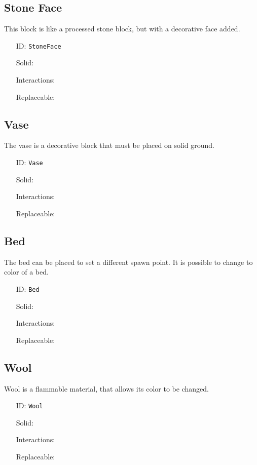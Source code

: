 \subsection{Stone Face}\label{subsec:blocks_stone face}
This block is like a processed stone block, but with a decorative face added.
\newline
\begin{itemize}[nosep]
    \item[ID:] \texttt{StoneFace}
    \item[Solid:]  \Checkmark \item[Interactions:]  \XSolidBrush \item[Replaceable:]  \XSolidBrush
\end{itemize}

\subsection{Vase}\label{subsec:blocks_vase}
The vase is a decorative block that must be placed on solid ground.
\newline
\begin{itemize}[nosep]
    \item[ID:] \texttt{Vase}
    \item[Solid:]  \Checkmark \item[Interactions:]  \XSolidBrush \item[Replaceable:]  \XSolidBrush
\end{itemize}

\subsection{Bed}\label{subsec:blocks_bed}
The bed can be placed to set a different spawn point.
It is possible to change to color of a bed.
\newline
\begin{itemize}[nosep]
    \item[ID:] \texttt{Bed}
    \item[Solid:]  \Checkmark \item[Interactions:]  \Checkmark \item[Replaceable:]  \XSolidBrush
\end{itemize}

\subsection{Wool}\label{subsec:blocks_wool}
Wool is a flammable material, that allows its color to be changed.
\newline
\begin{itemize}[nosep]
    \item[ID:] \texttt{Wool}
    \item[Solid:]  \Checkmark \item[Interactions:]  \Checkmark \item[Replaceable:]  \XSolidBrush
\end{itemize}


